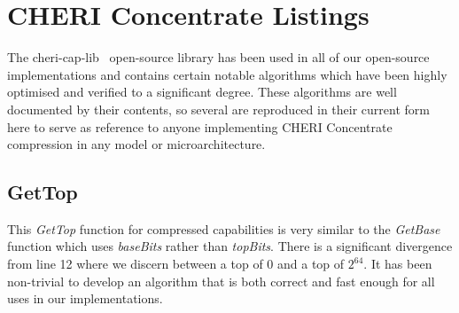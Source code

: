\chapter{CHERI Concentrate Listings}
\label{app:cheri-128-listings}

The cheri-cap-lib~\cite{CHERI-cheri-cap-lib} open-source library has been used in all of our open-source~\cite{CHERI-cheri-cpu,CHERI-Piccolo,CHERI-Flute,CHERI-Toooba} implementations and contains certain notable algorithms which have been highly optimised and verified to a significant degree.
These algorithms are well documented by their contents, so several are reproduced in their current form here to serve as reference to anyone implementing CHERI Concentrate compression in any model or microarchitecture.

\section{GetTop}
\label{sec:cheri-128-listings-gettop}

This \emph{GetTop} function for compressed capabilities is very similar to the \emph{GetBase} function which uses \emph{baseBits} rather than \emph{topBits}.
There is a significant divergence from line 12 where we discern between a top of 0 and a top of $2^{64}$.
It has been non-trivial to develop an algorithm that is both correct and fast enough for all uses in our implementations.

